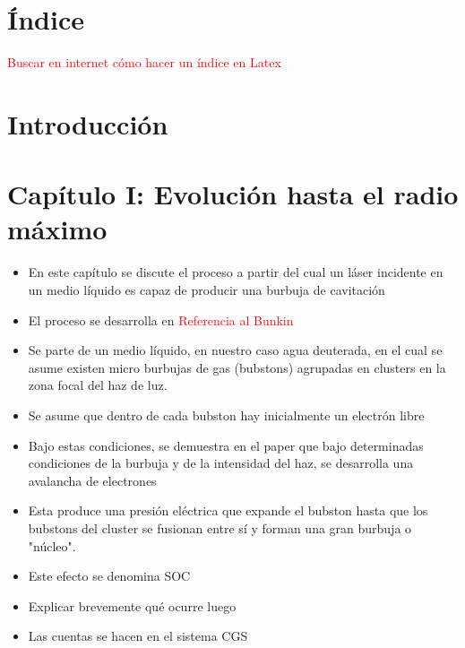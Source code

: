 \documentclass[aps,prb,twocolumn,superscriptaddress,floatfix,longbibliography,10pt]{revtex4-2}
\newif\ifptitle
\newif\ifpnumber
\newcounter{para}
\newcommand\ptitle[1]{\par\refstepcounter{para}
{\ifpnumber{\noindent\textcolor{lightgray}{\textbf{\thepara}}\indent}\fi}
{\ifptitle{\textbf{[{#1}]}}\fi}}
\begin{document}
\section*{Índice}
\textcolor{red}{Buscar en internet cómo hacer un índice en Latex}

\section*{Introducción}


















\section*{Capítulo I: Evolución hasta el radio máximo}

\ptitle{Resumen del capítulo}
\begin{itemize}
  \item En este capítulo se discute el proceso a partir del cual un láser incidente en un medio líquido es capaz de producir una burbuja de cavitación
  \item El proceso se desarrolla en \textcolor{red}{Referencia al Bunkin}
  \item Se parte de un medio líquido, en nuestro caso agua deuterada, en el cual se asume existen micro burbujas de gas (bubstons) agrupadas en clusters en la zona focal del haz de luz. 
  \item Se asume que dentro de cada bubston hay inicialmente un electrón libre
  \item Bajo estas condiciones, se demuestra en el paper que bajo determinadas condiciones de la burbuja y de la intensidad del haz, se desarrolla una avalancha de electrones
  \item Esta produce una presión eléctrica que expande el bubston hasta que los bubstons del cluster se fusionan entre sí y forman una gran burbuja o "núcleo". 
  \item Este efecto se denomina SOC
  \item Explicar brevemente qué ocurre luego
  \item Las cuentas se hacen en el sistema CGS

\end{itemize}
\end{document}
